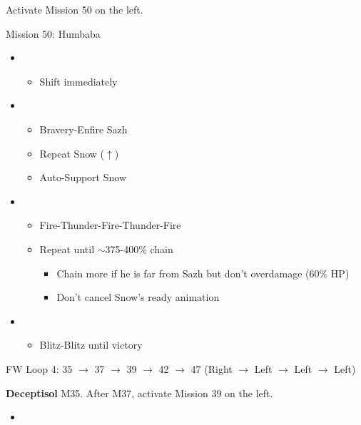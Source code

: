 Activate Mission 50 on the left.

\begin{battle}{Mission 50: Humbaba}
	\begin{itemize}
		\item \fourth
			\begin{itemize}
				\item Shift immediately
			\end{itemize}
		\item \third
			\begin{itemize}
				\item Bravery-Enfire Sazh
				\item Repeat Snow ($\uparrow$)
				\item Auto-Support Snow
			\end{itemize}
		\item \sixth
			\begin{itemize}
				\item Fire-Thunder-Fire-Thunder-Fire
				\item Repeat until $\sim$375-400\% chain
					\begin{itemize}
						\item Chain more if he is far from Sazh but don't overdamage (60\% HP)
						\item Don't cancel Snow's ready animation
					\end{itemize}
			\end{itemize}
		\item \first
			\begin{itemize}
				\item Blitz-Blitz until victory
			\end{itemize}												
	\end{itemize}
\end{battle}

FW Loop 4: 35 $\rightarrow$ 37 $\rightarrow$ 39 $\rightarrow$ 42 $\rightarrow$ 47 (Right $\rightarrow$ Left $\rightarrow$ Left $\rightarrow$ Left)

\textbf{Deceptisol} M35.
After M37, activate Mission 39 on the left.

\begin{menu}
	\begin{itemize}
	\paradigm
		\begin{itemize}
			\item {}%
				{\paradigmline{\com}{(\sen)}{\med}}%
				{\paradigmline{(\sab)}{\sen}{\sab}}%
				{\paradigmline[4]{\syn}{\sen}{\sab}}%
				{\paradigmline{\com}{\com}{\sab}}%
				{\paradigmline{\rav}{\sen}{\rav}}%
				{\paradigmline{\rav}{\rav}{\rav}}%
		\end{itemize}
	\end{itemize}
\end{menu}

